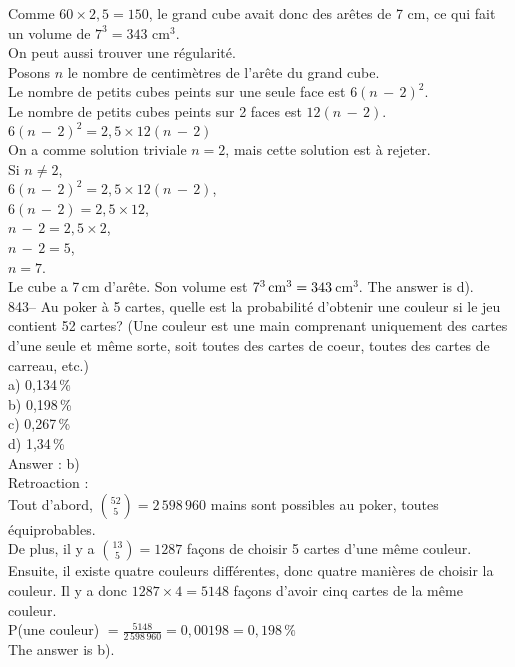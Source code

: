 ﻿\documentclass[letterpaper, 12pt]{article}
\begin{document}
Comme $60\times2,5=150$, le grand cube avait donc des ar\^etes de 7
cm, ce qui fait un volume de $7^3 = 343$ cm${^3}$.\\

On peut aussi trouver une r\'egularit\'e.\\
Posons $n$ le nombre de centim\`etres de l'ar\^ete du grand cube.\\
Le nombre de petits cubes peints sur une seule face est $6\left(
n\,-\,2\right) ^{2}$.\\
Le nombre de petits cubes peints sur 2 faces est $12\left( n\,-\,2\right)
$.\\

$6\left( n\,-\,2\right) ^{2}=2,5\times12\left( n\,-\,2\right) $\\
On a comme solution triviale $n=2$, mais cette solution est \`a rejeter.\\

Si $n\neq2$,\\
$6\left( n\,-\,2\right) ^{2}=2,5\times12\left( n\,-\,2\right) $,\\
$6\left( n\,-\,2\right)=2,5\times12 $,\\
$ n\,-\,2=2,5\times2 $,\\
$ n\,-\,2=5 $,\\
$ n=7 $.\\
Le cube a 7\,cm d'ar\^ete.  Son volume est
$7^3\textrm{\,cm}^{3}=343$\,cm$^{3}$.  The answer is d).\\

843-- Au poker \`a 5 cartes, quelle est la probabilit\'e d'obtenir une
couleur si le jeu contient 52 cartes? (Une couleur est une main comprenant
uniquement des cartes d'une seule et m\^eme sorte, soit toutes des cartes de
coeur, toutes des cartes de carreau, etc.) \\
a) 0,134\,\%\\
b) 0,198\,\%\\
c) 0,267\,\%\\
d) 1,34\,\%\\

Answer : b)\\

Retroaction : \\
Tout d'abord, $\binom{52}{5}=2\,598\,960$ mains sont possibles au poker,
toutes \'equiprobables.  \\[2mm]
De plus, il y a $\binom{13}{5}=1287$ fa\c cons de choisir 5 cartes d'une
m\^eme couleur.  Ensuite, il existe quatre couleurs diff\'erentes, donc
quatre mani\`eres de choisir la couleur.  Il y a donc $1287\times4=5148$
fa\c cons d'avoir cinq cartes de la m\^eme couleur.  \\[2mm]
P(une couleur) $=\frac{5148}{2\,598\,960}=0,00198=0,198\,\%$\\[2mm]
The answer is b).\\
\end{document}
